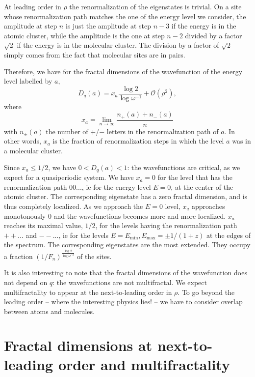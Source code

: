 \documentclass[aps,prl,preprint]{revtex4-1}
\begin{document}
At leading order in $\rho$ the renormalization of the eigenstates is trivial. 
On a site whose renormalization path matches the one of the energy level we consider, the amplitude at step $n$ is just the amplitude at step $n-3$ if the energy is in the atomic cluster, while the amplitude is the one at step $n-2$ divided by a factor $\sqrt{2}$ if the energy is in the molecular cluster.
The division by a factor of $\sqrt{2}$ simply comes from the fact that molecular sites are in pairs.

Therefore, we have for the fractal dimensions of the wavefunction of the energy level labelled by $a$,
\begin{equation}
\label{eq:dqpsi0}
	D_q(a) = x_a \frac{\log 2}{\log \omega^{-1}} + \mathcal{O}(\rho^2),
\end{equation}
where
\begin{equation}
	x_a = \lim_{n \rightarrow \infty} \frac{n_+(a)+n_-(a)}{n}
\end{equation}
with $n_\pm(a)$ the number of $+$/$-$ letters in the renormalization path of $a$.
In other words, $x_a$ is the fraction of renormalization steps in which the level $a$ was in a molecular cluster.

Since $x_a \leq 1/2$, we have $0 < D_q(a) < 1$: the wavefunctions are critical, as we expect for a quasiperiodic system.
We have $x_a = 0$ for the level that has the renormalization path $00...$, ie for the energy level $E=0$, at the center of the atomic cluster. The corresponding eigenstate has a zero fractal dimension, and is thus completely localized. As we approach the $E=0$ level, $x_a$ approaches monotonously $0$ and the wavefunctions becomes more and more localized.
$x_a$ reaches its maximal value, $1/2$, for the levels having the renormalization path $++...$ and $--...$, ie for the levels $E=E_\text{min}, E_\text{max} = \pm 1/(1+z)$ at the edges of the spectrum.
The corresponding eigenstates are the most extended. They occupy a fraction $(1/F_n)^{\frac{\log 2}{\log \omega^{-2}}}$ of the sites.

It is also interesting to note that the fractal dimensions of the wavefunction does not depend on $q$: the wavefunctions are not multifractal.
We expect multifractality to appear at the next-to-leading order in $\rho$.
To go beyond the leading order -- where the interesting physics lies! -- we have to consider overlap between atoms and molecules.

\section{Fractal dimensions at next-to-leading order and multifractality}
 
\end{document}
